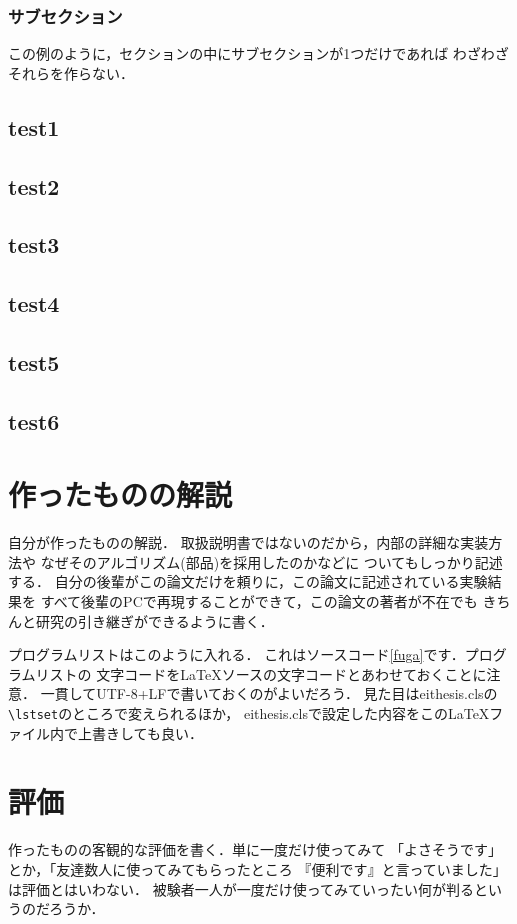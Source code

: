 \documentclass{eithesis}
\begin{document}
\subsection{サブセクション}
この例のように，セクションの中にサブセクションが1つだけであれば
わざわざそれらを作らない．

\section{test1}
\section{test2}
\clearpage
\section{test3}
\section{test4}
\clearpage
\section{test5}
\section{test6}
\clearpage

\chapter{作ったものの解説}
自分が作ったものの解説．
取扱説明書ではないのだから，内部の詳細な実装方法や
なぜそのアルゴリズム(部品)を採用したのかなどに
ついてもしっかり記述する．
自分の後輩がこの論文だけを頼りに，この論文に記述されている実験結果を
すべて後輩のPCで再現することができて，この論文の著者が不在でも
きちんと研究の引き継ぎができるように書く．

プログラムリストはこのように入れる．
これはソースコード\ref{fuga}です．プログラムリストの
文字コードを\LaTeX ソースの文字コードとあわせておくことに注意．
一貫してUTF-8+LFで書いておくのがよいだろう．
見た目はeithesis.clsの\verb+\lstset+のところで変えられるほか，
eithesis.clsで設定した内容をこの\LaTeX ファイル内で上書きしても良い．




\chapter{評価}
作ったものの客観的な評価を書く．単に一度だけ使ってみて
「よさそうです」とか，「友達数人に使ってみてもらったところ
『便利です』と言っていました」は評価とはいわない．
被験者一人が一度だけ使ってみていったい何が判るというのだろうか．
\end{document}
